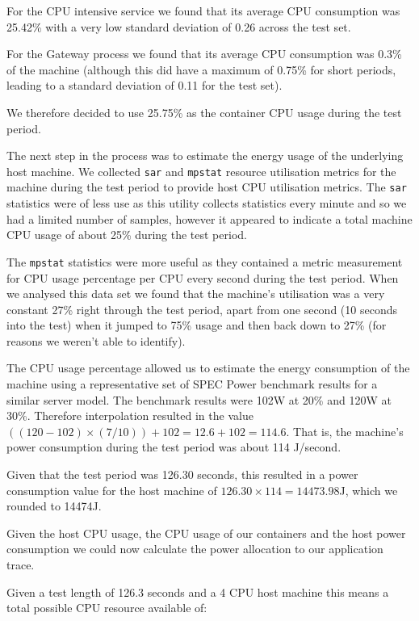 For the CPU intensive service we found that its average CPU consumption was 25.42\% with a very low standard deviation of 0.26 across the test set.

For the Gateway process we found that its average CPU consumption was 0.3\% of the machine (although this did have a maximum of 0.75\% for short periods, leading to a standard deviation of 0.11 for the test set).

We therefore decided to use 25.75\% as the container CPU usage during the test period.

The next step in the process was to estimate the energy usage of the underlying host machine.  We collected \texttt{sar} and \texttt{mpstat} resource utilisation metrics for the machine during the test period to provide host CPU utilisation metrics.  The \texttt{sar} statistics were of less use as this utility collects statistics every minute and so we had a limited number of samples, however it appeared to indicate a total machine CPU usage of about 25\% during the test period.

The \texttt{mpstat} statistics were more useful as they contained a metric measurement for CPU usage percentage per CPU every second during the test period.  When we analysed this data set we found that the machine's utilisation was a very constant 27\% right through the test period, apart from one second (10 seconds into the test) when it jumped to 75\% usage and then back down to 27\% (for reasons we weren't able to identify).

The CPU usage percentage allowed us to estimate the energy consumption of the machine using a representative set of SPEC Power benchmark results for a similar server model.  The benchmark results were 102W at 20\% and 120W at 30\%.  Therefore interpolation resulted in the value $((120 - 102) \times (7/10)) + 102 = 12.6 + 102 = 114.6$.  That is, the machine's power consumption during the test period was about 114 J/second.

Given that the test period was 126.30 seconds, this resulted in a power consumption value for the host machine of $126.30 \times 114 = 14473.98$J, which we rounded to 14474J.

Given the host CPU usage, the CPU usage of our containers and the host power consumption we could now calculate the power allocation to our application trace.

Given a test length of 126.3 seconds and a 4 CPU host machine this means a total possible CPU resource available of:

